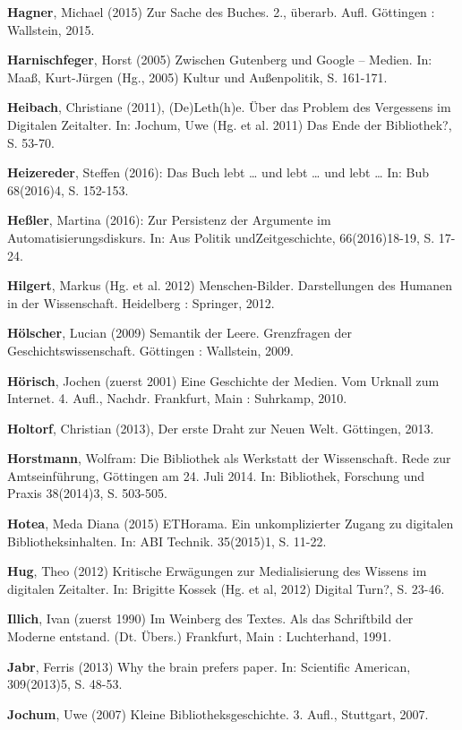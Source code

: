 \documentclass[a4paper,
fontsize=11pt,
oneside,
numbers=noperiodatend,
parskip=half-,
bibliography=totoc,
final
]{scrartcl}
\begin{document}
\textbf{Hagner}, Michael (2015) Zur Sache des Buches. 2., überarb. Aufl.
Göttingen : Wallstein, 2015.

\textbf{Harnischfeger}, Horst (2005) Zwischen Gutenberg und Google --
Medien. In: Maaß, Kurt-Jürgen (Hg., 2005) Kultur und Außenpolitik, S.
161-171.

\textbf{Heibach}, Christiane (2011), (De)Leth(h)e. Über das Problem des
Vergessens im Digitalen Zeitalter. In: Jochum, Uwe (Hg. et al. 2011) Das
Ende der Bibliothek?, S. 53-70.

\textbf{Heizereder}, Steffen (2016): Das Buch lebt \ldots{} und lebt
\ldots{} und lebt \ldots{} In: Bub 68(2016)4, S. 152-153.

\textbf{Heßler}, Martina (2016): Zur Persistenz der Argumente im
Automatisierungsdiskurs. In: Aus Politik undZeitgeschichte,
66(2016)18-19, S. 17-24.

\textbf{Hilgert}, Markus (Hg. et al. 2012) Menschen-Bilder.
Darstellungen des Humanen in der Wissenschaft. Heidelberg : Springer,
2012.

\textbf{Hölscher}, Lucian (2009) Semantik der Leere. Grenzfragen der
Geschichtswissenschaft. Göttingen : Wallstein, 2009.

\textbf{Hörisch}, Jochen (zuerst 2001) Eine Geschichte der Medien. Vom
Urknall zum Internet. 4. Aufl., Nachdr. Frankfurt, Main : Suhrkamp,
2010.

\textbf{Holtorf}, Christian (2013), Der erste Draht zur Neuen Welt.
Göttingen, 2013.

\textbf{Horstmann}, Wolfram: Die Bibliothek als Werkstatt der
Wissenschaft. Rede zur Amtseinführung, Göttingen am 24. Juli 2014. In:
Bibliothek, Forschung und Praxis 38(2014)3, S. 503-505.

\textbf{Hotea}, Meda Diana (2015) ETHorama. Ein unkomplizierter Zugang
zu digitalen Bibliotheksinhalten. In: ABI Technik. 35(2015)1, S. 11-22.

\textbf{Hug}, Theo (2012) Kritische Erwägungen zur Medialisierung des
Wissens im digitalen Zeitalter. In: Brigitte Kossek (Hg. et al, 2012)
Digital Turn?, S. 23-46.

\textbf{Illich}, Ivan (zuerst 1990) Im Weinberg des Textes. Als das
Schriftbild der Moderne entstand. (Dt. Übers.) Frankfurt, Main :
Luchterhand, 1991.

\textbf{Jabr}, Ferris (2013) Why the brain prefers paper. In: Scientific
American, 309(2013)5, S. 48-53.

\textbf{Jochum}, Uwe (2007) Kleine Bibliotheksgeschichte. 3. Aufl.,
Stuttgart, 2007.
\end{document}
